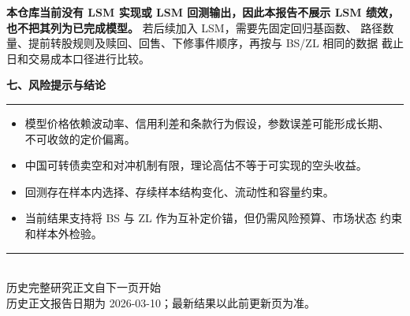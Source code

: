 \documentclass[11pt,a4paper]{ctexart}
\newcommand{\sectionbar}[1]{%
  \vspace{0.4em}
  {\color{navy}\Large\bfseries #1}\par
  \vspace{0.2em}
  {\color{blue}\rule{\textwidth}{1.2pt}}\par
}
\begin{document}
\textbf{本仓库当前没有 LSM 实现或 LSM 回测输出，因此本报告不展示 LSM
绩效，也不把其列为已完成模型。} 若后续加入 LSM，需要先固定回归基函数、
路径数量、提前转股规则及赎回、回售、下修事件顺序，再按与 BS/ZL 相同的数据
截止日和交易成本口径进行比较。

\sectionbar{七、风险提示与结论}

\begin{itemize}
  \item 模型价格依赖波动率、信用利差和条款行为假设，参数误差可能形成长期、
        不可收敛的定价偏离。
  \item 中国可转债卖空和对冲机制有限，理论高估不等于可实现的空头收益。
  \item 回测存在样本内选择、存续样本结构变化、流动性和容量约束。
  \item 当前结果支持将 BS 与 ZL 作为互补定价锚，但仍需风险预算、市场状态
        约束和样本外检验。
\end{itemize}

\vfill
\begin{center}
  \color{muted}
  \rule{0.75\textwidth}{0.5pt}\\[0.6em]
  \large 历史完整研究正文自下一页开始\\
  \small 历史正文报告日期为 2026-03-10；最新结果以此前更新页为准。
\end{center}
\end{document}
